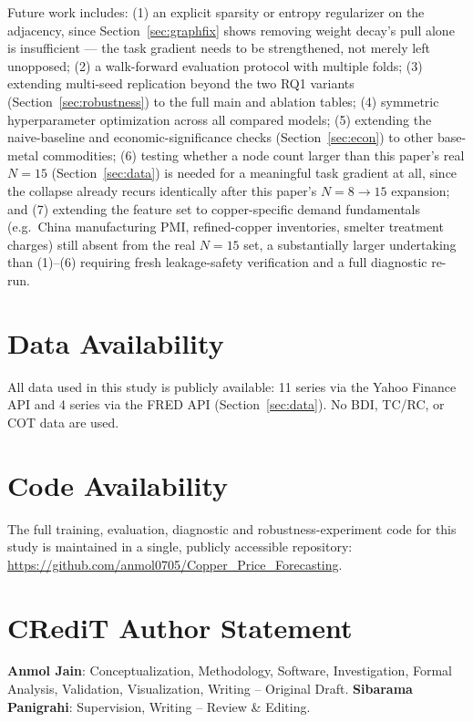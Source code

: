 \documentclass[journal]{IEEEtran}
\begin{document}
Future work includes: (1) an explicit sparsity or entropy regularizer on the adjacency, since Section~\ref{sec:graphfix} shows removing weight decay's pull alone is insufficient --- the task gradient needs to be strengthened, not merely left unopposed; (2) a walk-forward evaluation protocol with multiple folds; (3) extending multi-seed replication beyond the two RQ1 variants (Section~\ref{sec:robustness}) to the full main and ablation tables; (4) symmetric hyperparameter optimization across all compared models; (5) extending the naive-baseline and economic-significance checks (Section~\ref{sec:econ}) to other base-metal commodities; (6) testing whether a node count larger than this paper's real $N=15$ (Section~\ref{sec:data}) is needed for a meaningful task gradient at all, since the collapse already recurs identically after this paper's $N=8\to15$ expansion; and (7) extending the feature set to copper-specific demand fundamentals (e.g.\ China manufacturing PMI, refined-copper inventories, smelter treatment charges) still absent from the real $N=15$ set, a substantially larger undertaking than (1)--(6) requiring fresh leakage-safety verification and a full diagnostic re-run.

\section*{Data Availability}

All data used in this study is publicly available: 11 series via the Yahoo Finance API and 4 series via the FRED API (Section~\ref{sec:data}). No BDI, TC/RC, or COT data are used.

\section*{Code Availability}

The full training, evaluation, diagnostic and robustness-experiment code for this
study is maintained in a single, publicly accessible repository:
\url{https://github.com/anmol0705/Copper_Price_Forecasting}.

\section*{CRediT Author Statement}

\textbf{Anmol Jain}: Conceptualization, Methodology, Software, Investigation, Formal Analysis, Validation, Visualization, Writing -- Original Draft. \textbf{Sibarama Panigrahi}: Supervision, Writing -- Review \& Editing.
\end{document}
